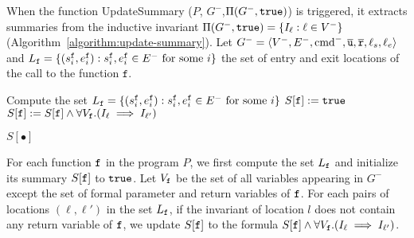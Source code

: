 When the function UpdateSummary ($P$, $G^-$,$\Pi (G^-, \mathtt{true})$) is triggered, it extracts summaries from the inductive invariant $\Pi (G^-, \mathtt{true})= \{ I_\ell : \ell \in V^-
\}$ (Algorithm~\ref{algorithm:update-summary}). 
Let $G^- = \langle V^-, E^-, \textmd{cmd}^-, \overline{\mathtt{u}}, \overline{\mathtt{r}},\ell_s,\ell_e \rangle$ and $L_{\mathtt{{f}}}=\{(s_i^{\mathtt{{f}}},e_i^{\mathtt{{f}}}):s_i^{\mathtt{{f}}}, e_i^{\mathtt{{f}}}\in E^-\mbox{ for some }i\}$
the set of entry and exit locations of the call to the function $\mathtt{f}$.

\begin{algorithm}

  {	
  	Compute the set $L_{\mathtt{{f}}}=\{(s_i^{\mathtt{{f}}},e_i^{\mathtt{{f}}}):s_i^{\mathtt{{f}}}, e_i^{\mathtt{{f}}}\in E^-\mbox{ for some }i\}$\;
  	$S[\mathtt{{f}}]:=\mathtt{true}$\;
   	{
       	{
         		$S[\mathtt{{f}}]:=S[\mathtt{{f}}]\wedge \forall V_\mathtt{f}. (I_\ell \implies I_{\ell'})$\;
       	}	
   	}
    
  }
 
  \Return $S[\bullet]$\;
  \caption{$\textmd{UpdateSummary} (P, G^-,\Pi (G^-, \TT))$}
  \label{algorithm:update-summary}
\end{algorithm}

For each function $\mathtt{{f}}$ in the program $P$, we first compute the set $L_{\mathtt{{f}}}$  and initialize its summary $S[\mathtt{{f}}]$ to $\mathtt{true}$.
Let $V_{\mathtt{{f}}}$ be the set of all variables appearing in $G^-$ except the set of formal parameter and return variables of $\mathtt{{f}}$.
For each pairs of locations $(\ell,\ell')$ in the set $L_{\mathtt{{f}}}$, if the invariant of location $l$ does not contain any return variable of $\mathtt{{f}}$, we update $S[\mathtt{{f}}]$ to the formula $S[\mathtt{{f}}]\wedge \forall V_{\mathtt{{f}}}. (I_\ell \implies I_{\ell'})$.

